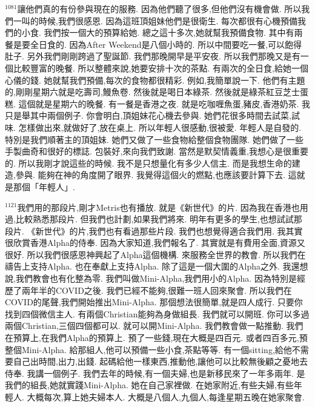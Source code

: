 \documentclass{book}
\begin{document}
$^{1081}$讓他們真的有份參與現在的服務.
因為他們聽了很多,但他們沒有機會做.
所以我們一叫的時候,我們很感恩.
因為這班頂姐妹他們是很衛生.
每次都很有心機預備我們的小食.
我們按一個大的預算給她.
總之這十多次,她就幫我預備食物.
其中有兩餐是要全日食的.
因為After Weekend是八個小時的.
所以中間要吃一餐,可以飽得肚子.
另外我們剛剛跨過了聖誕節.
我們那晚開早是平安夜.
所以我們那晚又是有一個比較豐富的晚餐.
所以整體來說,她要安排十次的茶點.
有兩次的全日食,給她一個心儀的錢.
她就幫我們預備,每次的食物都很精彩.
例如,我簡單說一下.
他們有主題的,剛剛星期六就是吃壽司,鰻魚卷.
然後就是喝日本綠茶.
然後就是綠茶紅豆芝士蛋糕.
這個就是星期六的晚餐.
有一餐是香港之夜.
就是吃咖喱魚蛋,豬皮,香港奶茶.
我只是舉其中兩個例子.
你會明白,頂姐妹花心機去參與.
她們花很多時間去試菜,試味.
怎樣做出來,就做好了,放在桌上.
所以年輕人很感動,很被愛.
年輕人是自發的.
特別是我們順著主的頂姐妹.
她們又做了一些食物給整個食物團隊.
她們做了一些手製曲奇和很好的標誌.
包裝好,來向我們致謝.
當然是默契情義重,我想心是很重要的.
所以我剛才說這些的時候.
我不是只想量化有多少人信主.
而是我想生命的建造,參與.
能夠在神的角度開了眼界.
我覺得這個火的燃點,也應該要計算下去.
這就是那個「年輕人」.

$^{1121}$我們用的那段片,剛才Metris也有播放.
就是《新世代》的片.
因為我在香港也用過,比較熟悉那段片.
但我們也計劃,如果我們將來.
明年有更多的學生,也想試試那段片.
《新世代》的片,我們也有看過那些片段.
我們也想覺得適合我們用.
我其實很欣賞香港Alpha的侍奉.
因為大家知道,我們報名了.
其實就是有費用全面,資源又很好.
所以我們很感恩神興起了Alpha這個機構.
來服務全世界的教會.
所以我們在禱告上支持Alpha.
也在奉獻上支持Alpha.
除了這是一個大圍的Alpha之外.
我還想說,我們教會也有化整為零.
我們叫做Mini-Alpha,我們用小的Alpha.
因為特別是經歷了兩年半的COVID之後.
我們已經不能夠,很難一班人回來聚會.
所以我們在COVID的尾聲,我們開始推出Mini-Alpha.
那個想法很簡單,就是四人成行.
只要你找到四個微信主人.
有兩個Christian能夠為身做組長.
我們就可以開班.
你可以多過兩個Christian,三個四個都可以.
就可以開Mini-Alpha.
我們教會做一點推動.
我們在預算上,在我們Alpha的預算上.
預了一些錢,現在大概是四百元.
或者四百多元,預整個Mini-Alpha.
給那組人,他可以預備一些小食,茶點等等.
有一個sitting,給他不需要自己出時間,出力,出錢.
起碼給他一樣東西,推動他,讓他可以比較無後顧之憂地去侍奉.
我講一個例子.
我們去年的時候,有一個夫婦,也是新移民來了一年多兩年.
是我們的組長,她就實踐Mini-Alpha.
她在自己家裡做.
在她家附近,有些夫婦,有些年輕人.
大概每次,算上她夫婦本人.
大概是八個人,九個人,每逢星期五晚在她家聚會.
\end{document}
